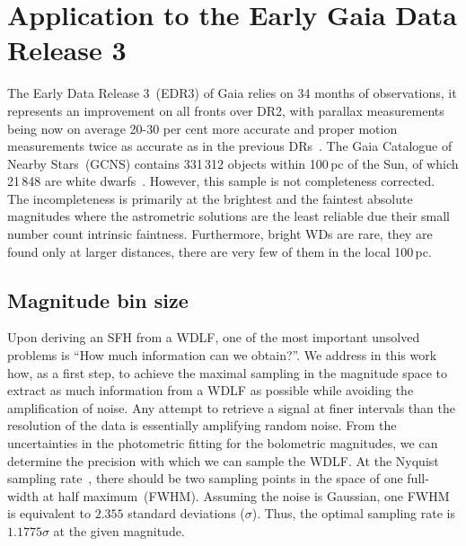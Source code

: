 \documentclass[fleqn,usenatbib]{mnras}
\begin{document}
\section{Application to the Early Gaia Data Release 3}
The Early Data Release 3~(EDR3) of Gaia relies on 34 months of observations, it
represents an improvement on all fronts over DR2, with parallax measurements
being now on average 20-30 per cent more accurate and proper motion measurements
twice as accurate as in the previous
DRs~\citep{2021A&A...649A...1G, 2021A&A...649A...2L}. The Gaia Catalogue of
Nearby Stars~(GCNS) contains 331\,312 objects within 100\,pc of the Sun, of
which 21\,848 are white dwarfs~\citep{2021A&A...649A...6G}. However, this sample
is not completeness corrected. The incompleteness is primarily at the brightest
and the faintest absolute magnitudes where the astrometric solutions are the
least reliable due their small number count intrinsic faintness. Furthermore,
bright WDs are rare, they are found only at larger distances, there are very
few of them in the local 100\,pc.

\subsection{Magnitude bin size}
\label{sec:magnitude_bin_size}
Upon deriving an SFH from a WDLF, one of the most important unsolved problems
is ``How much information can we obtain?''. We address in this work how, as a
first step, to achieve the maximal sampling in the magnitude space to extract
as much information from a WDLF as possible while avoiding the amplification of
noise. Any attempt to retrieve a signal at finer intervals than the
resolution of the data is essentially amplifying random noise. From the
uncertainties in the photometric fitting for the bolometric magnitudes, we can
determine the precision with which we can sample the WDLF. At the Nyquist
sampling rate~\citep{1949IEEEP..37...10S}, there should be two sampling points
in the space of one full-width at half maximum~(FWHM). Assuming the noise is
Gaussian, one FWHM is equivalent to $2.355$ standard deviations ($\sigma$).
Thus, the optimal sampling rate is $1.1775\sigma$ at the given magnitude.
\end{document}
